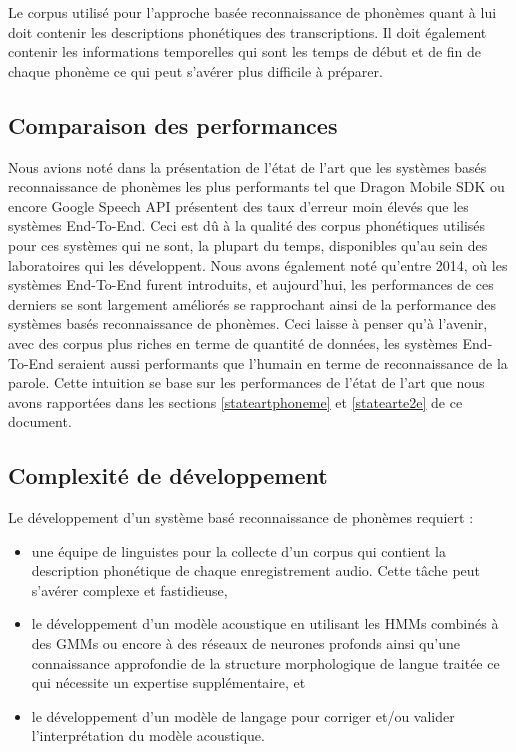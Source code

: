 Le corpus utilisé pour l'approche basée reconnaissance de phonèmes quant à lui doit contenir les descriptions phonétiques des transcriptions. Il doit également contenir les informations temporelles qui sont les temps de début et de fin de chaque phonème ce qui peut s'avérer plus difficile à préparer.

\subsection{Comparaison des performances}
Nous avions noté dans la présentation de l'état de l'art que les systèmes basés reconnaissance de phonèmes les plus performants tel que Dragon Mobile SDK ou encore Google Speech API présentent des taux d'erreur moin élevés que les systèmes End-To-End. Ceci est dû à la qualité des corpus phonétiques utilisés pour ces systèmes qui ne sont, la plupart du temps, disponibles qu'au sein des laboratoires qui les développent. Nous avons également noté qu'entre 2014, où les systèmes End-To-End furent introduits, et aujourd'hui, les performances de ces derniers se sont largement améliorés se rapprochant ainsi de la performance des systèmes basés reconnaissance de phonèmes. Ceci laisse à penser qu'à l'avenir, avec des corpus plus riches en terme de quantité de données, les systèmes End-To-End seraient aussi performants que l'humain en terme de reconnaissance de la parole. Cette intuition se base sur les performances de l'état de l'art que nous avons rapportées dans les sections \ref{stateartphoneme} et \ref{statearte2e} de ce document.

\subsection{Complexité de développement}
Le développement d'un système basé reconnaissance de phonèmes requiert :
\begin{itemize}
    \item une équipe de linguistes pour la collecte d'un corpus qui contient la description phonétique de chaque enregistrement audio. Cette tâche peut s'avérer complexe et fastidieuse,
    \item le développement d'un modèle acoustique en utilisant les HMMs combinés à des GMMs ou encore à des réseaux de neurones profonds ainsi qu'une connaissance approfondie de la structure morphologique de langue traitée ce qui nécessite un expertise supplémentaire, et
    \item le développement d'un modèle de langage pour corriger et/ou valider l'interprétation du modèle acoustique. \\
\end{itemize}

